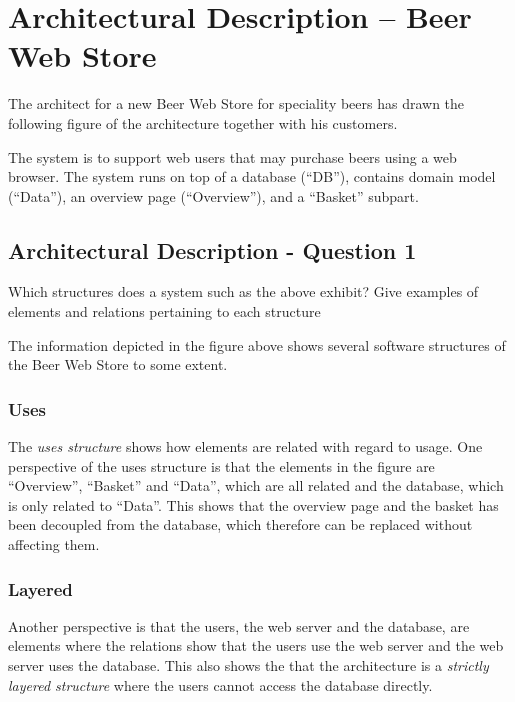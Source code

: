 \section{Architectural Description -- Beer Web Store}

The architect for a new Beer Web Store for speciality beers has drawn
the following figure of the architecture together with his customers.
\begin{figure}[h!]
  \centerline{}
\end{figure}
The system is to support web users that may purchase beers using a web
browser. The system runs on top of a database (``DB''), contains
domain model (``Data''), an overview page (``Overview''), and a
``Basket'' subpart.

\subsection{Architectural Description - Question 1}
\label{sec:arch_desc_q1}

\begin{question}
Which structures does a system such as the above exhibit?
Give examples of elements and relations pertaining to each
structure
\end{question}

The information depicted in the figure above shows several
software structures of the Beer Web Store to some extent.

\subsubsection{Uses}

The \emph{uses structure} shows how elements are related with regard
to usage. One perspective of the uses structure is that the
elements in the figure are ``Overview'', ``Basket'' and ``Data'',
which are all related and the database, which is only related
to ``Data''. This shows that the overview page and the basket
has been decoupled from the database, which therefore can be
replaced without affecting them.

\subsubsection{Layered}

Another perspective is that the users, the web server and the
database, are elements where the relations show that the users
use the web server and the web server uses the database. This
also shows the that the architecture is a
\emph{strictly layered structure} where the users cannot
access the database directly.

